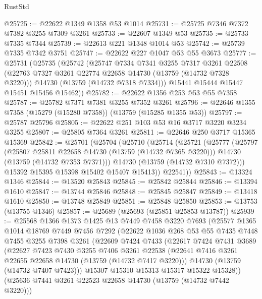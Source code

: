 \begin{lexlean}{RustStd}
\begin{coremodule}
@25725 := @22622 @1349 @1358 @53 @1014
@25731 := @25725 @7346 @7372 @7382 @3255 @7309 @3261
@25733 := @22607 @1349 @53
@25735 := @25733 @7335 @7344
@25739 := @22613 @221 @1348 @1014 @53
@25742 := @25739 @7335 @7342 @3751
@25747 := @22622 @227 @1047 @53 @55 @3673
@25777 := @25731
    (@25735
      (@25742
        (@25747
          @7334
          @7341
          @3255
          @7317
          @3261
          @22508
          (@22763 @7327 @3261 @22774 @22658 @14730 (@13759 (@14732 @7328 @3220)))
          @14730
          (@13759 (@14732 @7318 @7334)))
        @15441
        @15444
        @15447
        @15451
        @15456
        @15462))
@25782 := @22622 @1356 @253 @53 @55 @7358
@25787 := @25782 @7371 @7381 @3255 @7352 @3261
@25796 := @22646 @1355 @7358 (@15279 (@15280 @7358)) (@13759 (@15285 @1355 @53))
@25797 := @25787 @25796
@25805 := @22622 @251 @103 @53 @16 @3717 @3220 @3234 @3255
@25807 := @25805 @7364 @3261
@25811 := @22646 @250 @3717 @15365 @15369
@25842 := @25701
    (@25704
      (@25710
        (@25714
          (@25721
            (@25777
              (@25797
                (@25807 @25811 @22658 @14730 (@13759 (@14732 @7365 @3220)))
                @14730
                (@13759 (@14732 @7353 @7371)))
              @14730
              (@13759 (@14732 @7310 @7372)))
            @15392
            @15395
            @15398
            @15402
            @15407
            @15413))
        @22541))
@25843 := @13324 @1346
@25844 := @13520 @25843
@25845 := @25842 @25844
@25846 := @13394 @1610
@25847 := @13744 @25846
@25848 := @25845 @25847
@25849 := @13418 @1610
@25850 := @13748 @25849
@25851 := @25848 @25850
@25853 := @13753 (@13755 @1346)
@25857 := @25689 (@25693 (@25851 @25853 @13787))
@25939 := @25568
    @1366
    @1373
    @1425
    @13
    @7449
    @7458
    @3220
    @7693
    (@25577
      @1365
      @1014
      @18769
      @7449
      @7456
      @7292
      (@22622
        @1036
        @268
        @53
        @55
        @7435
        @7448
        @7455
        @3255
        @7398
        @3261
        (@22609
          @7424
          @7433
          (@22617
            @7424
            @7431
            @3689
            (@22627
              @7423
              @7430
              @3255
              @7406
              @3261
              @22538
              (@22641 @7416 @3261 @22655 @22658 @14730 (@13759 (@14732 @7417 @3220)))
              @14730
              (@13759 (@14732 @7407 @7423)))
            @15307
            @15310
            @15313
            @15317
            @15322
            @15328))
        (@25636 @7441 @3261 @22523 @22658 @14730 (@13759 (@14732 @7442 @3220)))

\end{coremodule}
\end{lexlean}

